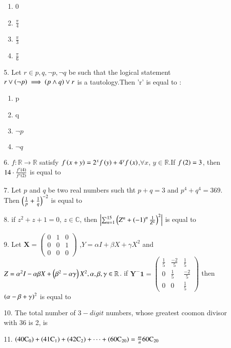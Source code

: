 \documentclass[journal,12pt,onecolumn]{IEEEtran}
\theoremstyle{remark}
\begin{document}
\begin{enumerate}
    \begin{enumerate}
        \item 0
        \item $\frac{\pi}{4}$
        \item $\frac{\pi}{3}$
        \item $\frac{\pi}{6}$
    \end{enumerate}
    \item[5.] Let $r \in {p,q,\neg p,\neg q}$ be such that the logical statement $r\lor \left(\neg p\right)\implies\left(p\land q\right)\lor r$ is a tautology.Then 'r' is equal to :
    \begin{enumerate}
        \item p
        \item q
        \item $\neg p$
        \item $\neg q$
    \end{enumerate}
    \item[6.] $f: \mathbb{R} \to \mathbb{R}$ satisfy $f\left(x+y\right)=2^xf\left(y\right)+4^yf\left(x\right)$,$\forall x$,  $y \in \mathbb{R}$.If $f\left(2\right)=3$, then $14\cdot \frac{f^{\prime}\left(4\right)}{f^{\prime}\left(2\right)}$ is equal to 
    \item[7.] Let $p$ and $q$ be two real numbers such tht $p+q=3$
and $p^4+q^4=369$. Then $\left(\frac{1}{p}+\frac{1}{q}\right)^{-2}$ is equal to 
\item[8.] if $z^2+z+1=0$, $z \in \mathbb{C}$, then $\left\vert\sum_{n=1}^{15}\left(Z^n+{\left(-1\right)^n\frac{1}{Z^n}}\right)^2\right\vert$ is equal to 
\item[9.] Let $\mathbf{X} = \begin{pmatrix}
0 & 1 & 0 \\
0 & 0 & 1 \\
0 & 0 & 0
\end{pmatrix}$ ,$Y=\alpha I+\beta X+\gamma X^2$ and $Z={\alpha^2}I-\alpha \beta X+\left({\beta^2}-\alpha \gamma\right)X^2,\alpha ,\beta ,\gamma \in \mathbb{R}$. if $\mathbf{Y^-1} = \begin{pmatrix}
\frac{1}{5} & \frac{-2}{5} & \frac{1}{5} \\
0 & \frac{1}{5} & \frac{-2}{5} \\
0 & 0 & \frac{1}{5}
\end{pmatrix}$ then $\left(\alpha -\beta +\gamma\right)^2$ is equal to 
\item[10.] The total number of $3-digit$ numbers, whose greatest coomon divisor with 36 is 2, is 
\item[11.] $\left(\mathrm{40C_0}\right)+\left(\mathrm{41C_1}\right)+\left(\mathrm{42C_2}\right)+\cdots +\left(\mathrm{60C_{20}}\right)=\frac{m}{n}\mathrm{60C_{20}}$

\end{enumerate}
\end{document}
